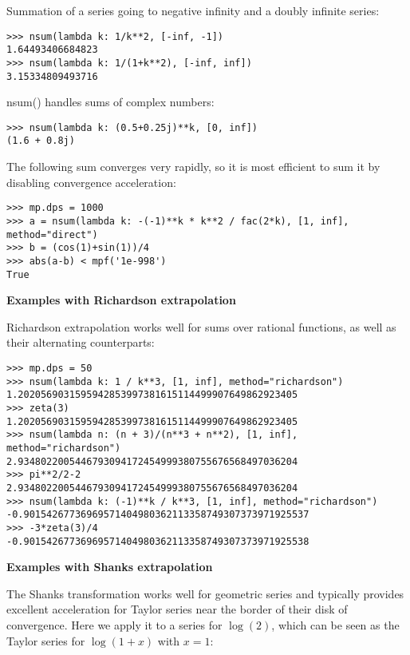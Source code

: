 Summation of a series going to negative infinity and a doubly infinite series:

\begin{lstlisting}
>>> nsum(lambda k: 1/k**2, [-inf, -1])
1.64493406684823
>>> nsum(lambda k: 1/(1+k**2), [-inf, inf])
3.15334809493716
\end{lstlisting}

nsum() handles sums of complex numbers:

\begin{lstlisting}
>>> nsum(lambda k: (0.5+0.25j)**k, [0, inf])
(1.6 + 0.8j)
\end{lstlisting}


The following sum converges very rapidly, so it is most efficient to sum it by disabling convergence acceleration:

\begin{lstlisting}
>>> mp.dps = 1000
>>> a = nsum(lambda k: -(-1)**k * k**2 / fac(2*k), [1, inf], method="direct")
>>> b = (cos(1)+sin(1))/4
>>> abs(a-b) < mpf('1e-998')
True
\end{lstlisting}

\vpara
\textbf{Examples with Richardson extrapolation}

Richardson extrapolation works well for sums over rational functions, as well as their alternating counterparts:

\begin{lstlisting}
>>> mp.dps = 50
>>> nsum(lambda k: 1 / k**3, [1, inf], method="richardson")
1.2020569031595942853997381615114499907649862923405
>>> zeta(3)
1.2020569031595942853997381615114499907649862923405
>>> nsum(lambda n: (n + 3)/(n**3 + n**2), [1, inf], method="richardson")
2.9348022005446793094172454999380755676568497036204
>>> pi**2/2-2
2.9348022005446793094172454999380755676568497036204
>>> nsum(lambda k: (-1)**k / k**3, [1, inf], method="richardson")
-0.90154267736969571404980362113358749307373971925537
>>> -3*zeta(3)/4
-0.90154267736969571404980362113358749307373971925538
\end{lstlisting}

\vpara
\textbf{Examples with Shanks extrapolation}

The Shanks transformation works well for geometric series and typically provides excellent acceleration for Taylor series near the border of their disk of convergence. Here we apply it to a series for $\log(2)$, which can be seen as the Taylor series for $\log(1+x)$ with $x=1$:

